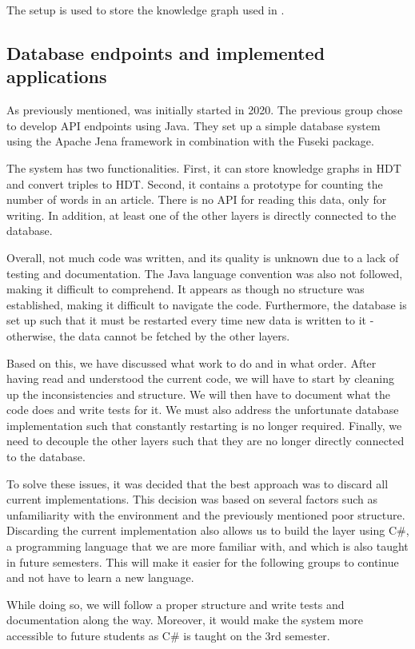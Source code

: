 The setup is used to store the knowledge graph used in \knox{}.

\subsection{Database endpoints and implemented applications}

As previously mentioned, \knox{} was initially started in 2020.
The previous group chose to develop API endpoints using Java.
They set up a simple database system using the Apache Jena framework in combination with the Fuseki package.

The system has two functionalities. 
First, it can store knowledge graphs in HDT and convert triples to HDT.
Second, it contains a prototype for counting the number of words in an article.
There is no API for reading this data, only for writing. 
In addition, at least one of the other layers is directly connected to the database.

Overall, not much code was written, and its quality is unknown due to a lack of testing and documentation.
The Java language convention was also not followed\cite{java_convention}, making it difficult to comprehend.
It appears as though no structure was established, making it difficult to navigate the code. 
Furthermore, the database is set up such that it must be restarted every time new data is written to it - otherwise, the data cannot be fetched by the other layers\cite{knox2020}.

Based on this, we have discussed what work to do and in what order.
After having read and understood the current code, we will have to start by cleaning up the inconsistencies and structure.
We will then have to document what the code does and write tests for it.
We must also address the unfortunate database implementation such that constantly restarting is no longer required.
Finally, we need to decouple the other layers such that they are no longer directly connected to the database.

To solve these issues, it was decided that the best approach was to discard all current implementations. 
This decision was based on several factors such as unfamiliarity with the environment and the previously mentioned poor structure. 
Discarding the current implementation also allows us to build the layer using C\#, a programming language that we are more familiar with, and which is also taught in future semesters. 
This will make it easier for the following groups to continue and not have to learn a new language.

While doing so, we will follow a proper structure and write tests and documentation along the way. 
Moreover, it would make the system more accessible to future students as C\# is taught on the 3rd semester.
